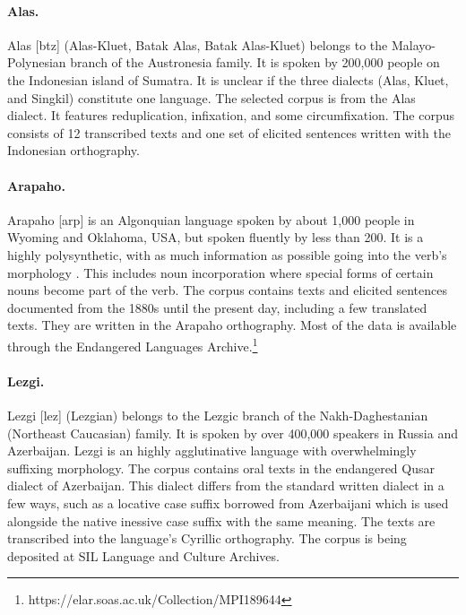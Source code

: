 \paragraph{Alas.}
Alas [btz] (Alas-Kluet, Batak Alas, Batak Alas-Kluet) belongs to the Malayo-Polynesian branch of the Austronesia family. It is spoken by 200,000 people on the Indonesian island of Sumatra. It is unclear if the three dialects (Alas, Kluet, and Singkil) constitute one language. The selected corpus is from the Alas dialect. It features reduplication, infixation, and some circumfixation. The corpus consists of 12 transcribed texts and one set of elicited sentences written with the Indonesian orthography.

\paragraph{Arapaho.}
Arapaho [arp] is an Algonquian language spoken by about 1,000 people in Wyoming and Oklahoma, USA, but spoken fluently by less than 200. It is a highly polysynthetic, with as much information as possible going into the verb's morphology \citep{cowell_arapaho_2008}. This includes noun incorporation where special forms of certain nouns become part of the verb. The corpus contains texts and elicited sentences documented from the 1880s until the present day, including a few translated texts. They are written in the Arapaho orthography. Most of the data is available through the Endangered Languages Archive.\footnote{https://elar.soas.ac.uk/Collection/MPI189644}

\paragraph{Lezgi.} 
Lezgi [lez] (Lezgian) belongs to the Lezgic branch of the Nakh-Daghestanian (Northeast Caucasian) family. It is spoken by over 400,000 speakers in Russia and Azerbaijan. Lezgi is an highly agglutinative language with overwhelmingly suffixing morphology. The corpus contains oral texts in the endangered Qusar dialect of Azerbaijan. This dialect differs from the standard written dialect in a few ways, such as a locative case suffix borrowed from Azerbaijani which is used alongside the native inessive case suffix with the same meaning. The texts are transcribed into the language's Cyrillic orthography. The corpus is being deposited at SIL Language and Culture Archives.

